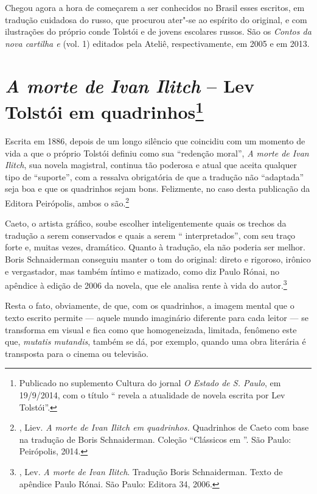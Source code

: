 Chegou agora a hora de começarem a ser conhecidos no Brasil esses
escritos, em tradução cuidadosa do russo, que procurou ater"-se
ao espírito do original, e com ilustrações do próprio conde
Tolstói e de jovens escolares russos. São os \emph{Contos da
nova cartilha  e } (vol. 1) editados pela
Ateliê, respectivamente, em 2005 e em 2013.



\chapter{\emph{A morte de Ivan Ilitch} -- Lev Tolstói em quadrinhos\footnote{Publicado no suplemento Cultura do jornal \emph{O Estado de S. Paulo}, em 19/9/2014, com o título ``{} revela a atualidade de novela escrita por Lev Tolstói''.}}

Escrita em 1886, depois de um longo silêncio que coincidiu
com um momento de vida a que o próprio Tolstói definiu como
sua ``redenção moral'', \emph{A morte de Ivan Ilitch}, sua
novela magistral, continua tão poderosa e atual que aceita
qualquer tipo de ``suporte'', com a ressalva obrigatória de que
a tradução não ``adaptada'' seja boa e que os quadrinhos sejam
bons. Felizmente, no caso desta publicação da Editora Peirópolis,
ambos o são.\footnote{, Liev. \emph{A morte de
Ivan Ilitch em quadrinhos.} Quadrinhos de Caeto com base na
tradução de Boris Schnaiderman. Coleção ``Clássicos em
''. São Paulo: Peirópolis, 2014.} 

Caeto, o artista gráfico, soube escolher inteligentemente quais os
trechos da tradução a serem conservados e quais a serem ``
interpretados'', com seu traço forte e, muitas vezes, dramático.
Quanto à tradução, ela não poderia ser melhor. Boris Schnaiderman
conseguiu manter o tom do original: direto e rigoroso, irônico e
vergastador, mas também íntimo e matizado, como diz Paulo Rónai,
no apêndice à edição de 2006 da novela, que ele analisa rente à
vida do autor.\footnote{, Lev. \emph{A morte de
Ivan Ilitch}. Tradução Boris Schnaiderman. Texto de apêndice
Paulo Rónai. São Paulo: Editora 34, 2006.}

Resta o fato, obviamente, de que, com os quadrinhos, a imagem
mental que o texto escrito permite --- aquele mundo imaginário
diferente para cada leitor --- se transforma em visual e fica
como que homogeneizada, limitada, fenômeno este que, \emph{mutatis
mutandis}, também se dá, por exemplo, quando uma obra literária é
transposta para o cinema ou televisão.

